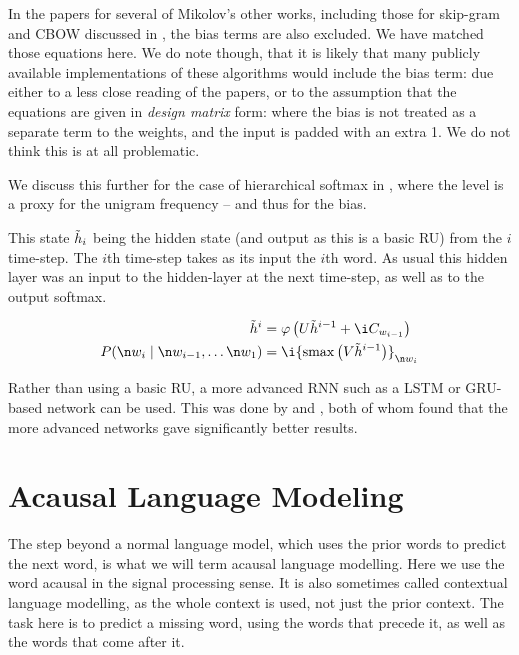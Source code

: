 {{	In the papers for several of Mikolov's other works, including those for skip-gram and CBOW discussed in , the bias terms are also excluded.
	We have matched those equations here.  
	We do note though, that it is likely that many publicly available implementations of these algorithms would include the bias term:
	due either to a less close reading of the papers,
	or to the assumption that the equations are given in \emph{design matrix} form: where the bias is not treated as a separate term to the weights, and the input is padded with an extra 1.
	We do not think this is at all problematic.
	
	We discuss this further for the case of hierarchical softmax in , where the level is a proxy for the unigram frequency -- and thus for the bias.
}

This state $\iv h_{i}$ being the hidden state  (and output as this is a basic RU) from the $i$ time-step.
The $i$th time-step takes as its input the $i$th word.
As usual this hidden layer was an input to the hidden-layer at the next time-step, as well as to the output softmax.
%

%
\begin{align}
	\nv h_{i} &= \varphi\left( U\nv h_{i-1} + \i C_{w_{i-1}} \right) \label{equ:rnnlm1} \\
	P(\n w_i \mid \n w_{i-1}, \ldots \n w_{1}) &= \i {\softmax\left(V \nv h_{i-1} \right)}_{\n w_i} \label{equ:rnnlm2}
\end{align}


Rather than using a basic RU, a more advanced RNN such as a LSTM or GRU-based network can be used.
This was done by  and ,
both of whom found that the more advanced networks gave significantly better results.

\section{Acausal Language Modeling}\label{sec:acausal-language-modeling}
The step beyond a normal language model,
which uses the prior words to predict the next word, is what we will term acausal language modelling.
Here we use the word acausal in the signal processing sense.
It is also sometimes called contextual language modelling, as the whole context is used, not just the prior context.
The task here is to predict a missing word, using the words that precede it, as well as the words that come after it.

}
